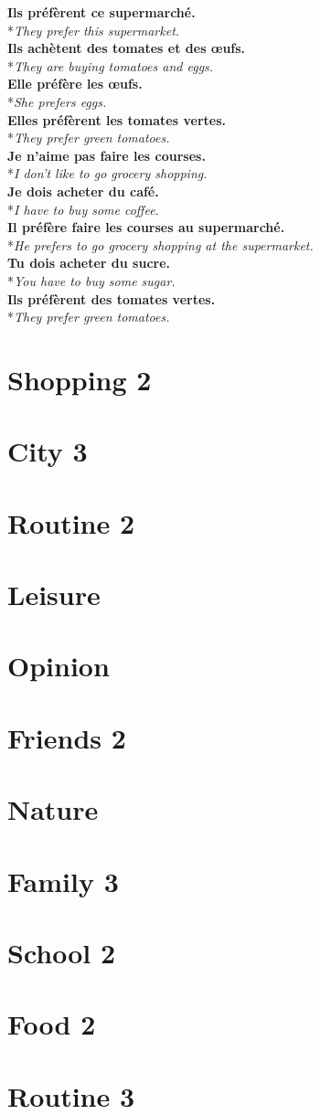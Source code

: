 \documentclass[a4paper,11pt,oneside]{book}
\newcommand{\phrase}[2]{\noindent\textbf{#1}\\*\-\hspace{0.5cm}\textit{#2}\\}
\begin{document}
\phrase{Ils préfèrent ce supermarché.}{They prefer this supermarket.}
\phrase{Ils achètent des tomates et des œufs.}{They are buying tomatoes and eggs.}
\phrase{Elle préfère les œufs.}{She prefers eggs.}
\phrase{Elles préfèrent les tomates vertes.}{They prefer green tomatoes.}
\phrase{Je n'aime pas faire les courses.}{I don't like to go grocery shopping.}
\phrase{Je dois acheter du café.}{I have to buy some coffee.}
\phrase{Il préfère faire les courses au supermarché.}{He prefers to go grocery shopping at the supermarket.}
\phrase{Tu dois acheter du sucre.}{You have to buy some sugar.}
\phrase{Ils préfèrent des tomates vertes.}{They prefer green tomatoes.}




\section{Shopping 2}
\section{City 3}
\section{Routine 2}
\section{Leisure}
\section{Opinion}
\section{Friends 2}
\section{Nature}
\section{Family 3}
\section{School 2}
\section{Food 2}
\section{Routine 3}
\end{document}
